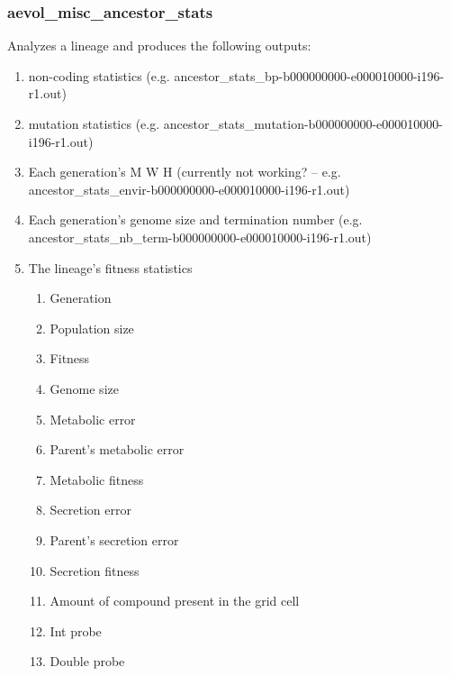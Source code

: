 \subsubsection{aevol\_misc\_ancestor\_stats}

Analyzes a lineage and produces the following outputs:
\begin{enumerate}
	\item non-coding statistics (e.g. ancestor\_stats\_bp-b000000000-e000010000-i196-r1.out)
	\item mutation statistics (e.g. ancestor\_stats\_mutation-b000000000-e000010000-i196-r1.out)
	\item Each generation’s M W H (currently not working? – e.g. ancestor\_stats\_envir-b000000000-e000010000-i196-r1.out)
	\item Each generation’s genome size and termination number (e.g. ancestor\_stats\_nb\_term-b000000000-e000010000-i196-r1.out)
	\item The lineage’s fitness statistics
	\begin{enumerate}
		\item Generation
		\item Population size
		\item Fitness
		\item Genome size
		\item Metabolic error
		\item Parent’s metabolic error
		\item Metabolic fitness
		\item Secretion error
		\item Parent’s secretion error
		\item Secretion fitness
		\item Amount of compound present in the grid cell
		\item Int probe
		\item Double probe
		

\end{enumerate}
\end{enumerate}
